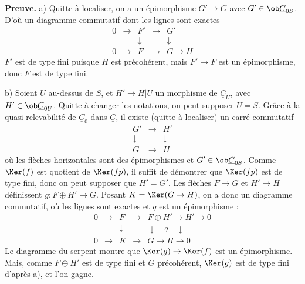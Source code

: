 \textbf{Preuve.} a) Quitte à localiser, on a un épimorphisme $G' \to G$ avec $G' \in \ob \underline{C}_{0S}$. D'où un diagramme commutatif dont les lignes sont exactes
\[
\begin{array}{ccccc}
0 & \longrightarrow & F' & \longrightarrow & G' \\
& & \downarrow & & \downarrow \\
0 & \longrightarrow & F & \longrightarrow & G \longrightarrow H
\end{array}
\]
$F'$ est de type fini puisque $H$ est précohérent, mais $F' \to F$ est un épimorphisme, donc $F$ est de type fini.

b) Soient $U$ au-dessus de $S$, et $H' \to H|U$ un morphisme de $\underline{C}_U$, avec $H' \in \ob \underline{C}_{0U}$. Quitte à changer les notations, on peut supposer $U = S$. Grâce à la quasi-relevabilité de $\underline{C}_0$ dans $\underline{C}$, il existe (quitte à localiser) un carré commutatif
\[
\begin{array}{ccc}
G' & \longrightarrow & H' \\
\downarrow & & \downarrow \\
G & \longrightarrow & H
\end{array}
\]
où les flèches horizontales sont des épimorphismes et $G' \in \ob \underline{C}_{0S}$. Comme $\Ker(f)$ est quotient de $\Ker(fp)$, il suffit de démontrer que $\Ker(fp)$ est de type fini, donc on peut supposer que $H' = G'$. Les flèches $F \to G$ et $H' \to H$ définissent $g : F \oplus H' \to G$. Posant $K = \Ker(G \to H)$, on a donc un diagramme commutatif, où les lignes sont exactes et $q$ est un épimorphisme :
\[
\begin{array}{ccccc}
0 & \longrightarrow & F & \longrightarrow & F \oplus H' \longrightarrow H' \longrightarrow 0 \\
& & \downarrow & & \downarrow \quad q \quad \downarrow \\
0 & \longrightarrow & K & \longrightarrow & G \longrightarrow H \longrightarrow 0
\end{array}
\]
Le diagramme du serpent montre que $\Ker(g) \to \Ker(f)$ est un épimorphisme. Mais, comme $F \oplus H'$ est de type fini et $G$ précohérent, $\Ker(g)$ est de type fini d'après a), et l'on gagne.

